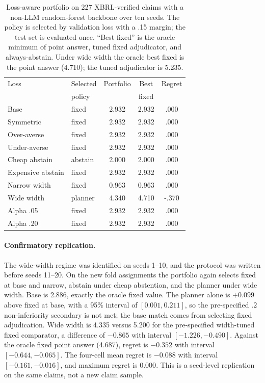 \documentclass[11pt]{article}
\begin{document}
\begin{table}[t]
\centering
\small
\setlength{\tabcolsep}{3pt}
\begin{tabular}{llccc}
\toprule
Loss & Selected & Portfolio & Best & Regret \\
 & policy & & fixed & \\
\midrule
Base & fixed & 2.932 & 2.932 & .000 \\
Symmetric & fixed & 2.932 & 2.932 & .000 \\
Over-averse & fixed & 2.932 & 2.932 & .000 \\
Under-averse & fixed & 2.932 & 2.932 & .000 \\
Cheap abstain & abstain & 2.000 & 2.000 & .000 \\
Expensive abstain & fixed & 2.932 & 2.932 & .000 \\
Narrow width & fixed & 0.963 & 0.963 & .000 \\
Wide width & planner & 4.340 & 4.710 & -.370 \\
Alpha .05 & fixed & 2.932 & 2.932 & .000 \\
Alpha .20 & fixed & 2.932 & 2.932 & .000 \\
\bottomrule
\end{tabular}
\caption{Loss-aware portfolio on 227 XBRL-verified claims with a non-LLM random-forest backbone over ten seeds. The policy is selected by validation loss with a .15 margin; the test set is evaluated once. ``Best fixed'' is the oracle minimum of point answer, tuned fixed adjudicator, and always-abstain. Under wide width the oracle best fixed is the point answer (4.710); the tuned adjudicator is 5.235.}
\label{tab:portfolio}
\end{table}

\paragraph{Confirmatory replication.}
The wide-width regime was identified on seeds 1--10, and the protocol was written before seeds 11--20. On the new fold assignments the portfolio again selects fixed at base and narrow, abstain under cheap abstention, and the planner under wide width. Base is 2.886, exactly the oracle fixed value. The planner alone is $+0.099$ above fixed at base, with a 95\% interval of $[0.001,0.211]$, so the pre-specified $.2$ non-inferiority secondary is not met; the base match comes from selecting fixed adjudication. Wide width is 4.335 versus 5.200 for the pre-specified width-tuned fixed comparator, a difference of $-0.865$ with interval $[-1.226,-0.490]$. Against the oracle fixed point answer (4.687), regret is $-0.352$ with interval $[-0.644,-0.065]$. The four-cell mean regret is $-0.088$ with interval $[-0.161,-0.016]$, and maximum regret is $0.000$. This is a seed-level replication on the same claims, not a new claim sample.
\end{document}
